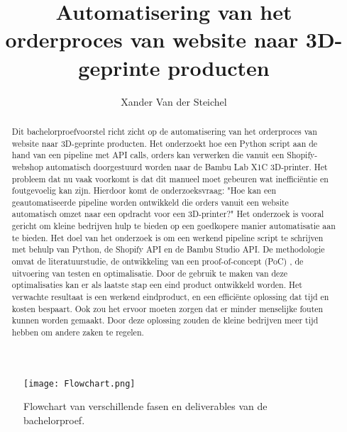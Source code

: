 \documentclass{hogent-article}
\title{Automatisering van het orderproces van website naar 3D-geprinte producten}
\author{Xander Van der Steichel}
\begin{document}
\begin{abstract}
    Dit bachelorproefvoorstel richt zicht op de automatisering van het orderproces van website naar 3D-geprinte producten. Het onderzoekt hoe een Python script aan de hand van een pipeline met API calls, orders kan verwerken die vanuit een Shopify-webshop automatisch doorgestuurd worden naar de Bambu Lab X1C 3D-printer. Het probleem dat nu vaak voorkomt is dat dit manueel moet gebeuren wat inefficiëntie en foutgevoelig kan zijn. Hierdoor komt de onderzoeksvraag: "Hoe kan een geautomatiseerde pipeline worden ontwikkeld die orders vanuit een website automatisch omzet naar een opdracht voor een 3D-printer?" Het onderzoek is vooral gericht om kleine bedrijven hulp te bieden op een goedkopere manier automatisatie aan te bieden. Het doel van het onderzoek is om een werkend pipeline script te schrijven met behulp van Python, de Shopify API en de Bambu Studio API. De methodologie omvat de literatuurstudie, de ontwikkeling van een proof-of-concept (PoC) , de uitvoering van testen en optimalisatie. Door de gebruik te maken van deze optimalisaties kan er als laatste stap een eind product ontwikkeld worden. Het verwachte resultaat is een werkend eindproduct, en een efficiënte oplossing dat tijd en kosten bespaart. Ook zou het ervoor moeten zorgen dat er minder menselijke fouten kunnen worden gemaakt. Door deze oplossing zouden de kleine bedrijven meer tijd hebben om andere zaken te regelen.
 
\end{abstract}




\tableofcontents



\printbibliography[heading=bibintoc]


\begin{figure}[H]  %
    \centering
    \texttt{[image: Flowchart.png]}  %
    \caption{Flowchart van verschillende fasen en deliverables van de bachelorproef.}
    \label{fig:flowchart}  %
\end{figure}
\end{document}
